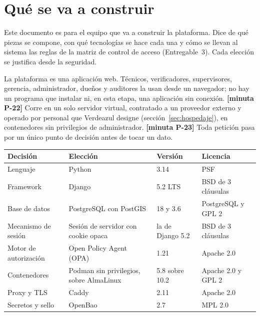 \documentclass[11pt,letterpaper]{article}
\newcommand{\cab}[1]{\textbf{\rmfamily #1}}
\newcommand{\resp}[1]{\textrm{\footnotesize\bfseries [minuta #1]}}
\begin{document}
\tableofcontents
\newpage
{}

\section{Qué se va a construir}

Este documento es para el equipo que va a construir la plataforma. Dice de qué piezas se compone, con
qué tecnologías se hace cada una y cómo se llevan al sistema las reglas de la matriz de control de
acceso (Entregable~3). Cada elección se justifica desde la seguridad.

La plataforma es una aplicación web. Técnicos, verificadores, supervisores, gerencia, administrador,
dueños y auditores la usan desde un navegador; no hay un programa que instalar ni, en esta etapa, una
aplicación sin conexión. \resp{P-22} Corre en un solo servidor virtual, contratado a un proveedor
externo y operado por personal que Verdeazul designe (sección~\ref{sec:hospedaje}), en contenedores sin
privilegios de administrador. \resp{P-23} Toda petición pasa por un único punto de decisión antes de
tocar un dato.

\begin{center}
\small
\renewcommand{\arraystretch}{1.13}
\begin{tabularx}{\textwidth}{@{}L{3.5cm} Y L{2.6cm} L{2.9cm}@{}}
\toprule
\cab{Decisión} & \cab{Elección} & \cab{Versión} & \cab{Licencia} \\
\midrule
Lenguaje & Python & 3.14 & PSF \\
Framework & Django & 5.2 LTS & BSD de 3 cláusulas \\
Base de datos & PostgreSQL con PostGIS & 18 y 3.6 & PostgreSQL y GPL 2 \\
Mecanismo de sesión & Sesión de servidor con cookie opaca & la de Django 5.2 & BSD de 3 cláusulas \\
Motor de autorización & Open Policy Agent (OPA) & 1.21 & Apache 2.0 \\
Contenedores & Podman sin privilegios, sobre AlmaLinux & 5.8 sobre 10.2 & Apache 2.0 y GPL 2 \\
\midrule
Proxy y TLS & Caddy & 2.11 & Apache 2.0 \\
Secretos y sello & OpenBao & 2.7 & MPL 2.0 \\
\bottomrule
\end{tabularx}
\end{center}
\end{document}
